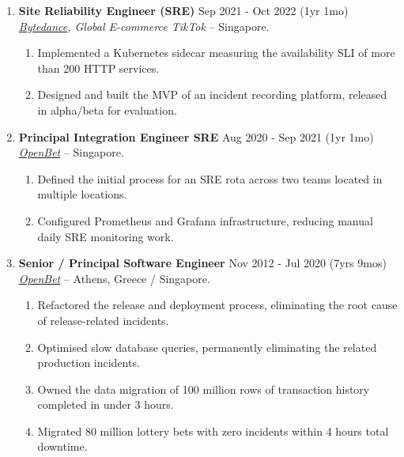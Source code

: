 \documentclass{CVSoftwareEngineer}
\renewcommand{\cvExperience}[5]{{#1 \hfill \scriptsize#4}\\ {\scriptsize {\small\textit{#2}} -- #3.} #5}
\begin{document}
\begin{enumerate}[labelwidth=!, labelindent=0pt, leftmargin=*, rightmargin=15pt]
		\item[] \cvExperience
			{\textbf{Site Reliability Engineer (SRE)}}
			{\href{https://www.bytedance.com/en}{Bytedance}, Global E-commerce TikTok}
			{Singapore}
			{Sep 2021 - Oct 2022 (1yr 1mo)}
			{
				\begin{enumerate}[labelwidth=!, labelindent=0pt, nosep, leftmargin=*]
					\item[\textasteriskcentered] Implemented a Kubernetes sidecar measuring the availability SLI of more than 200 HTTP services.
					\item[\textasteriskcentered] Designed and built the MVP of an incident recording platform, released in alpha/beta for evaluation.
				\end{enumerate}
			}

		\item[] \cvExperience
			{\textbf{Principal Integration Engineer \textbar\space SRE}}
			{\href{https://www.openbet.com/}{OpenBet}}
			{Singapore}
			{Aug 2020 - Sep 2021 (1yr 1mo)}
			{
				\begin{enumerate}[labelwidth=!, labelindent=0pt, nosep, leftmargin=*]
					\item[\textasteriskcentered] Defined the initial process for an SRE rota across two teams located in multiple locations.
					\item[\textasteriskcentered] Configured Prometheus and Grafana infrastructure, reducing manual daily SRE monitoring work.
				\end{enumerate}
			}

		\item[] \cvExperience
			{\textbf{Senior / Principal Software Engineer}}
			{\href{https://www.openbet.com/}{OpenBet}}
			{Athens, Greece / Singapore}
			{Nov 2012 - Jul 2020 (7yrs 9mos)}
			{
				\begin{enumerate}[labelwidth=!, labelindent=0pt, nosep, leftmargin=*]
					\item[\textasteriskcentered] Refactored the release and deployment process, eliminating the root cause of release-related incidents.
					\item[\textasteriskcentered] Optimised slow database queries, permanently eliminating the related production incidents.
					\item[\textasteriskcentered] Owned the data migration of 100 million rows of
						transaction history completed in under 3 hours.
					\item[\textasteriskcentered] Migrated 80 million lottery bets with zero incidents within 4 hours total downtime.
				\end{enumerate}
			}
	\end{enumerate}
\end{document}
